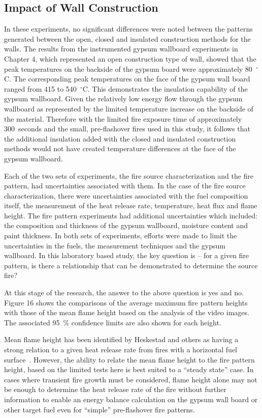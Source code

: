 \documentclass[twoside]{uocthesis}
\begin{document}
{\subsection{Impact of Wall Construction}

In these experiments, no significant differences were noted between the patterns generated between the open, closed and insulated construction methods for the walls.  The results from the instrumented gypsum wallboard experiments in Chapter 4, which represented an open construction type of wall, showed that the peak temperatures on the backside of the gypsum board were approximately 80~$^\circ$C.  The corresponding peak temperatures on the face of the gypsum wall board ranged from 415 to 540~$^\circ$C.  This demonstrates the insulation capability of the gypsum wallboard. Given the relatively low energy flow through the gypsum wallboard as represented by the limited temperature increase on the backside of the material.  Therefore with the limited fire exposure time of approximately 300~seconds and the small, pre-flashover fires used in this study, it follows that the additional insulation added with the closed and insulated construction methods would not have created temperature differences at the face of the gypsum wallboard.  

Each of the two sets of experiments, the fire source characterization and the fire pattern, had uncertainties associated with them.  In the case of the fire source characterization, there were uncertainties associated with the fuel composition itself, the measurement of the heat release rate, temperature, heat flux and flame height.  The fire pattern experiments had additional uncertainties which included: the composition and thickness of the gypsum wallboard, moisture content and paint thickness.  In both sets of experiments, efforts were made to limit the uncertainties in the fuels, the measurement techniques and the gypsum wallboard. In this laboratory based study, the key question is – for a given fire pattern, is there a relationship that can be demonstrated to determine the source fire?

At this stage of the research, the answer to the above question is yes and no.  Figure 16 shows the comparisons of the average maximum fire pattern heights with those of the mean flame height based on the analysis of the video images.  The associated 95~\% confidence limits are also shown for each height.  
         
Mean flame height has been identified by Heskestad and others as having a strong relation to a given heat release rate from fires with a horizontal fuel surface~\cite{Heskestad:SFPE, Beyler:1986}.  However, the ability to relate the mean flame height to the fire pattern height, based on the limited tests here is best suited to a “steady state” case.  In cases where transient fire growth must be considered, flame height alone may not be enough to determine the heat release rate of the fire without further information to enable an energy balance calculation on the gypsum wall board or other target fuel even for “simple” pre-flashover fire patterns.

}
\end{document}
